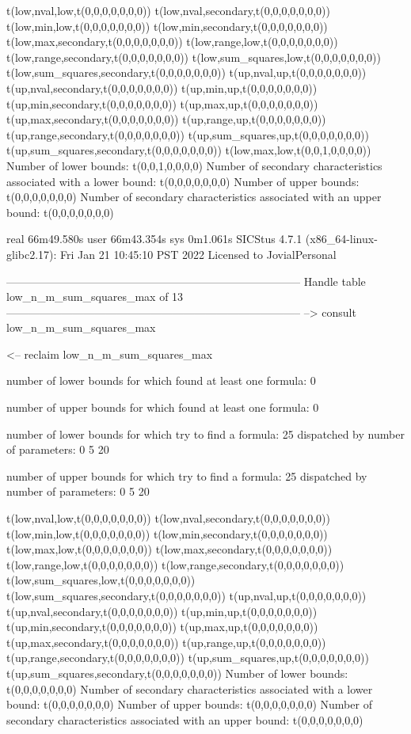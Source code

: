 t(low,nval,low,t(0,0,0,0,0,0,0))
t(low,nval,secondary,t(0,0,0,0,0,0,0))
t(low,min,low,t(0,0,0,0,0,0,0))
t(low,min,secondary,t(0,0,0,0,0,0,0))
t(low,max,secondary,t(0,0,0,0,0,0,0))
t(low,range,low,t(0,0,0,0,0,0,0))
t(low,range,secondary,t(0,0,0,0,0,0,0))
t(low,sum_squares,low,t(0,0,0,0,0,0,0))
t(low,sum_squares,secondary,t(0,0,0,0,0,0,0))
t(up,nval,up,t(0,0,0,0,0,0,0))
t(up,nval,secondary,t(0,0,0,0,0,0,0))
t(up,min,up,t(0,0,0,0,0,0,0))
t(up,min,secondary,t(0,0,0,0,0,0,0))
t(up,max,up,t(0,0,0,0,0,0,0))
t(up,max,secondary,t(0,0,0,0,0,0,0))
t(up,range,up,t(0,0,0,0,0,0,0))
t(up,range,secondary,t(0,0,0,0,0,0,0))
t(up,sum_squares,up,t(0,0,0,0,0,0,0))
t(up,sum_squares,secondary,t(0,0,0,0,0,0,0))
t(low,max,low,t(0,0,1,0,0,0,0))
Number of lower bounds:                                             t(0,0,1,0,0,0,0)
Number of secondary characteristics associated with a lower bound:  t(0,0,0,0,0,0,0)
Number of upper bounds:                                             t(0,0,0,0,0,0,0)
Number of secondary characteristics associated with an upper bound: t(0,0,0,0,0,0,0)

real	66m49.580s
user	66m43.354s
sys	0m1.061s
SICStus 4.7.1 (x86_64-linux-glibc2.17): Fri Jan 21 10:45:10 PST 2022
Licensed to JovialPersonal


--------------------------------------------------------------------------------
Handle table low_n_m_sum_squares_max of 13
--------------------------------------------------------------------------------
--> consult low_n_m_sum_squares_max

<-- reclaim low_n_m_sum_squares_max

number of lower bounds for which found at least one formula: 0

number of upper bounds for which found at least one formula: 0

number of lower bounds for which try to find a formula: 25
dispatched by number of parameters: 0  5  20

number of upper bounds for which try to find a formula: 25
dispatched by number of parameters: 0  5  20

t(low,nval,low,t(0,0,0,0,0,0,0))
t(low,nval,secondary,t(0,0,0,0,0,0,0))
t(low,min,low,t(0,0,0,0,0,0,0))
t(low,min,secondary,t(0,0,0,0,0,0,0))
t(low,max,low,t(0,0,0,0,0,0,0))
t(low,max,secondary,t(0,0,0,0,0,0,0))
t(low,range,low,t(0,0,0,0,0,0,0))
t(low,range,secondary,t(0,0,0,0,0,0,0))
t(low,sum_squares,low,t(0,0,0,0,0,0,0))
t(low,sum_squares,secondary,t(0,0,0,0,0,0,0))
t(up,nval,up,t(0,0,0,0,0,0,0))
t(up,nval,secondary,t(0,0,0,0,0,0,0))
t(up,min,up,t(0,0,0,0,0,0,0))
t(up,min,secondary,t(0,0,0,0,0,0,0))
t(up,max,up,t(0,0,0,0,0,0,0))
t(up,max,secondary,t(0,0,0,0,0,0,0))
t(up,range,up,t(0,0,0,0,0,0,0))
t(up,range,secondary,t(0,0,0,0,0,0,0))
t(up,sum_squares,up,t(0,0,0,0,0,0,0))
t(up,sum_squares,secondary,t(0,0,0,0,0,0,0))
Number of lower bounds:                                             t(0,0,0,0,0,0,0)
Number of secondary characteristics associated with a lower bound:  t(0,0,0,0,0,0,0)
Number of upper bounds:                                             t(0,0,0,0,0,0,0)
Number of secondary characteristics associated with an upper bound: t(0,0,0,0,0,0,0)


